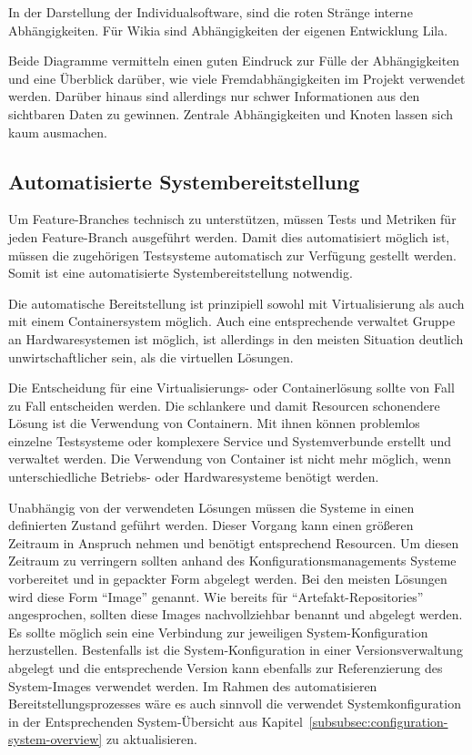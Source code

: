 In der Darstellung der Individualsoftware, sind die roten Stränge interne Abhängigkeiten. Für Wikia sind Abhängigkeiten der eigenen Entwicklung Lila.

Beide Diagramme vermitteln einen guten Eindruck zur Fülle der Abhängigkeiten und eine Überblick darüber, wie viele Fremdabhängigkeiten im Projekt verwendet werden. Darüber hinaus sind allerdings nur schwer Informationen aus den sichtbaren Daten zu gewinnen. Zentrale Abhängigkeiten und Knoten lassen sich kaum ausmachen.

\subsection{Automatisierte Systembereitstellung}

Um Feature-Branches technisch zu unterstützen, müssen Tests und Metriken für jeden Feature-Branch ausgeführt werden. Damit dies automatisiert möglich ist, müssen die zugehörigen Testsysteme automatisch zur Verfügung gestellt werden. Somit ist eine automatisierte Systembereitstellung notwendig.

Die automatische Bereitstellung ist prinzipiell sowohl mit Virtualisierung als auch mit einem Containersystem möglich. Auch eine entsprechende verwaltet Gruppe an Hardwaresystemen ist möglich, ist allerdings in den meisten Situation deutlich unwirtschaftlicher sein, als die virtuellen Lösungen.

Die Entscheidung für eine Virtualisierungs- oder Containerlösung sollte von Fall zu Fall entscheiden werden. Die schlankere und damit Resourcen schonendere Lösung ist die Verwendung von Containern. Mit ihnen können problemlos einzelne Testsysteme oder komplexere Service und Systemverbunde erstellt und verwaltet werden. Die Verwendung von Container ist nicht mehr möglich, wenn unterschiedliche Betriebs- oder Hardwaresysteme benötigt werden.

Unabhängig von der verwendeten Lösungen müssen die Systeme in einen definierten Zustand geführt werden. Dieser Vorgang kann einen größeren Zeitraum in Anspruch nehmen und benötigt entsprechend Resourcen. Um diesen Zeitraum zu verringern sollten anhand des Konfigurationsmanagements Systeme vorbereitet und in gepackter Form abgelegt werden. Bei den meisten Lösungen wird diese Form ``Image'' genannt. Wie bereits für ``Artefakt-Repositories'' angesprochen, sollten diese Images nachvollziehbar benannt und abgelegt werden. Es sollte möglich sein eine Verbindung zur jeweiligen System-Konfiguration herzustellen. Bestenfalls ist die System-Konfiguration in einer Versionsverwaltung abgelegt und die entsprechende Version kann ebenfalls zur Referenzierung des System-Images verwendet werden. Im Rahmen des automatisieren Bereitstellungsprozesses wäre es auch sinnvoll die verwendet Systemkonfiguration in der Entsprechenden System-Übersicht aus Kapitel~\ref{subsubsec:configuration-system-overview} zu aktualisieren.

